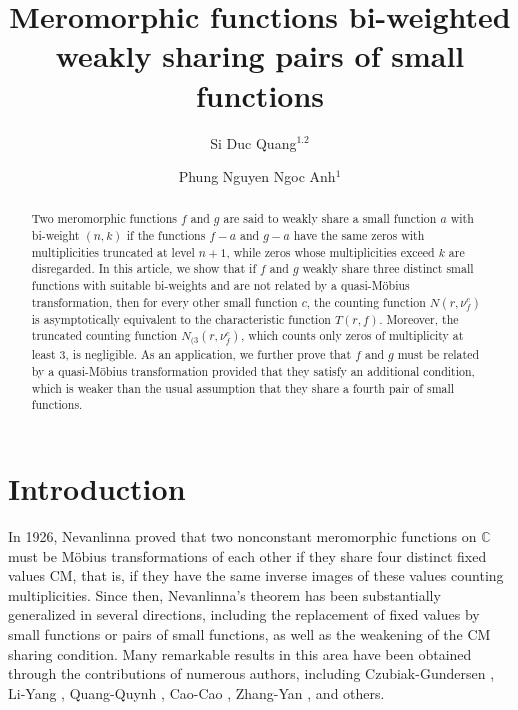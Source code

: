\documentclass[12pt,leqno]{amsart}
\title[Meromorphic functions bi-weighted weakly sharing pairs of small functions]{Meromorphic functions bi-weighted weakly sharing pairs of small functions}
\author{\sc Si Duc Quang$^{1.2}$}
\author{\sc Phung Nguyen Ngoc Anh$^1$}
\newcommand{\C}{{\mathbb{C}}}
\numberwithin{equation}{section}
\begin{document}
\begin{abstract} Two meromorphic functions $f$ and $g$ are said to weakly share a small function $a$ with bi-weight $(n,k)$ if the functions $f-a$ and $g-a$ have the same zeros with multiplicities truncated at level $n+1$, while zeros whose multiplicities exceed $k$ are disregarded. In this article, we show that if $f$ and $g$ weakly share three distinct small functions with suitable bi-weights and are not related by a quasi-M\"obius transformation, then for every other small function $c$, the counting function $N(r,\nu_f^c)$ is asymptotically equivalent to the characteristic function $T(r,f)$. Moreover, the truncated counting function $N_{(3}(r,\nu_f^c)$, which counts only zeros of multiplicity at least $3$, is negligible. As an application, we further prove that $f$ and $g$ must be related by a quasi-M\"obius transformation provided that they satisfy an additional condition, which is weaker than the usual assumption that they share a fourth pair of small functions.
\end{abstract}
\maketitle

\def\thefootnote{\empty}

\maketitle

\section{Introduction}

In 1926, Nevanlinna proved that two nonconstant meromorphic functions on $\C$ must be M\"obius transformations of each other if they share four distinct fixed values CM, that is, if they have the same inverse images of these values counting multiplicities. Since then, Nevanlinna's theorem has been substantially generalized in several directions, including the replacement of fixed values by small functions or pairs of small functions, as well as the weakening of the CM sharing condition. Many remarkable results in this area have been obtained through the contributions of numerous authors, including Czubiak-Gundersen \cite{CG}, Li-Yang \cite{LY1,LY2}, Quang-Quynh \cite{Q12,QQ}, Cao-Cao \cite{CC}, Zhang-Yan \cite{ZY}, and others. 
\end{document}
